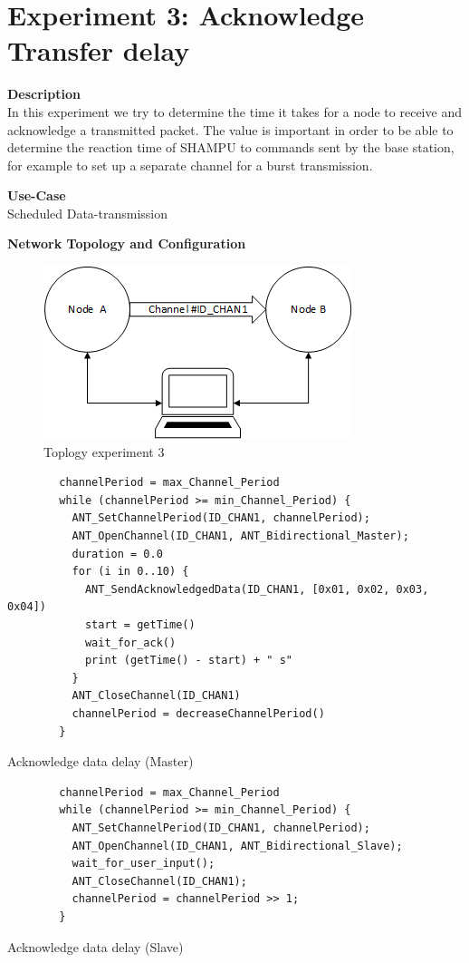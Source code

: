 \section{Experiment 3: Acknowledge Transfer delay}
\begin{description} 
	\item{\textbf{Description}} \hfill \\ In this experiment we try to determine the time it takes for a node to receive and acknowledge a transmitted packet. The value is important in order to be able to determine the reaction time of SHAMPU to commands sent by the base station, for example to set up a separate channel for a burst transmission.
	\item{\textbf{Use-Case}} \hfill \\ Scheduled Data-transmission
	\item{\textbf{Network Topology and Configuration}} \hfill \\ 
	\begin{figure}[H]
		\centering
		\includegraphics[scale=1]{./pics/exp_topo.png}
		\caption{Toplogy experiment 3}
	\end{figure}
	\begin{code}[H]
		\begin{verbatim}
		channelPeriod = max_Channel_Period
		while (channelPeriod >= min_Channel_Period) {
		  ANT_SetChannelPeriod(ID_CHAN1, channelPeriod);
		  ANT_OpenChannel(ID_CHAN1, ANT_Bidirectional_Master);
		  duration = 0.0
		  for (i in 0..10) {
		    ANT_SendAcknowledgedData(ID_CHAN1, [0x01, 0x02, 0x03, 0x04])
		    start = getTime()	   
		    wait_for_ack()		
		    print (getTime() - start) + " s"	  
		  }
		  ANT_CloseChannel(ID_CHAN1)		
		  channelPeriod = decreaseChannelPeriod()
		} 
		\end{verbatim}
		\caption{Acknowledge data delay (Master)}\label{lst:mExp3}
	\end{code}
	
	\begin{code}[H]
		\begin{verbatim}
		channelPeriod = max_Channel_Period
		while (channelPeriod >= min_Channel_Period) {
		  ANT_SetChannelPeriod(ID_CHAN1, channelPeriod);
		  ANT_OpenChannel(ID_CHAN1, ANT_Bidirectional_Slave);				 
		  wait_for_user_input();
		  ANT_CloseChannel(ID_CHAN1);
		  channelPeriod = channelPeriod >> 1;
		}
		\end{verbatim}
		\caption{Acknowledge data delay (Slave)}\label{lst:sExp3}
	\end{code}
	

\end{description}
